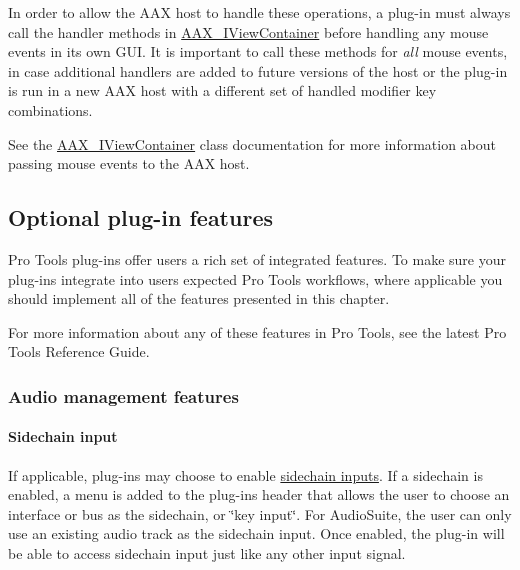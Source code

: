 In order to allow the A\+A\+X host to handle these operations, a plug-\/in must always call the handler methods in \hyperlink{a00117}{A\+A\+X\+\_\+\+I\+View\+Container} before handling any mouse events in its own G\+U\+I. It is important to call these methods for {\itshape all} mouse events, in case additional handlers are added to future versions of the host or the plug-\/in is run in a new A\+A\+X host with a different set of handled modifier key combinations.

See the \hyperlink{a00117}{A\+A\+X\+\_\+\+I\+View\+Container} class documentation for more information about passing mouse events to the A\+A\+X host.



 \hypertarget{a00360_aax_pro_tools_guide_05_optional_plugin_features}{}\subsection{Optional plug-\/in features}\label{a00360_aax_pro_tools_guide_05_optional_plugin_features}
Pro Tools plug-\/ins offer users a rich set of integrated features. To make sure your plug-\/ins integrate into users\textquotesingle{} expected Pro Tools workflows, where applicable you should implement all of the features presented in this chapter.

For more information about any of these features in Pro Tools, see the latest Pro Tools Reference Guide.

\hypertarget{a00360_subsection__audio_management_features}{}\subsubsection{Audio management features}\label{a00360_subsection__audio_management_features}
\hypertarget{a00360_subsubsection__sidechain_input_}{}\paragraph{Sidechain input}\label{a00360_subsubsection__sidechain_input_}
If applicable, plug-\/ins may choose to enable \hyperlink{a00338}{sidechain inputs}. If a sidechain is enabled, a menu is added to the plug-\/in\textquotesingle{}s header that allows the user to choose an interface or bus as the sidechain, or \char`\"{}key input\char`\"{}. For Audio\+Suite, the user can only use an existing audio track as the sidechain input. Once enabled, the plug-\/in will be able to access sidechain input just like any other input signal.

